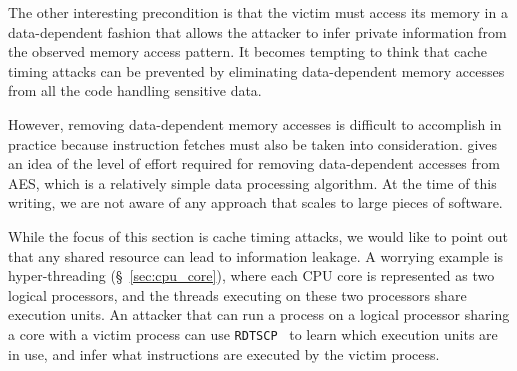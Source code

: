 The other interesting precondition is that the victim must access its memory in
a data-dependent fashion that allows the attacker to infer private information
from the observed memory access pattern. It becomes tempting to think that
cache timing attacks can be prevented by eliminating data-dependent memory
accesses from all the code handling sensitive data.

However, removing data-dependent memory accesses is difficult to accomplish in
practice because instruction fetches must also be taken into consideration.
\cite{kasper2009aes} gives an idea of the level of effort required for removing
data-dependent accesses from AES, which is a relatively simple data processing
algorithm. At the time of this writing, we are not aware of any approach that
scales to large pieces of software.

While the focus of this section is cache timing attacks, we would like to point
out that any shared resource can lead to information leakage. A worrying
example is hyper-threading (\S~\ref{sec:cpu_core}), where each CPU core is
represented as two logical processors, and the threads executing on these two
processors share execution units. An attacker that can run a process on a
logical processor sharing a core with a victim process can use
\texttt{RDTSCP}~\cite{petters1999making} to learn which execution units are in
use, and infer what instructions are executed by the victim process.
